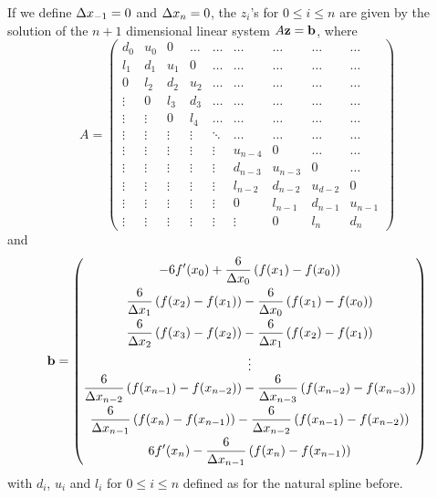 If we define $\Delta{x_{-1}} = 0$ and $\Delta{x_n} = 0$,
the $z_i$'s for $0\leq i \leq n$ are given by the solution of the
$n+1$ dimensional linear system $A \mathbf{z} = \mathbf{b}$,
where
\begin{equation} \label{ccs1}
A = \left( \begin{array}{ccccccccc}
d_0  & u_0 & 0 & \ldots & \ldots & \ldots & \ldots & \ldots & \ldots \\ 
l_1 & d_1  & u_1 & 0 & \ldots & \ldots & \ldots & \ldots & \ldots \\ 
0 & l_2 & d_2 & u_2 & \ldots & \ldots & \ldots & \ldots & \ldots \\ 
\vdots & 0 & l_3 & d_3 & \ldots & \ldots & \ldots & \ldots & \ldots \\ 
\vdots & \vdots & 0 & l_4 & \ldots & \ldots & \ldots & \ldots & \ldots \\ 
\vdots & \vdots & \vdots & \vdots & \ddots & \ldots & \ldots &
\ldots & \ldots \\ 
\vdots & \vdots & \vdots & \vdots & \vdots & u_{n-4} & 0 & \ldots & \ldots \\ 
\vdots & \vdots & \vdots & \vdots & \vdots & d_{n-3} &  u_{n-3} & 0 & \ldots \\ 
\vdots & \vdots & \vdots & \vdots & \vdots & l_{n-2} &  d_{n-2} & u_{d-2} & 0 \\ 
\vdots & \vdots & \vdots & \vdots & \vdots & 0 & l_{n-1} & d_{n-1} & u_{n-1} \\
\vdots & \vdots & \vdots & \vdots & \vdots & \vdots & 0 & l_n & d_n 
\end{array} \right)
\end{equation}
and
\[
\mathbf{b} = \begin{pmatrix}
\displaystyle - 6f'(x_0) + \frac{6}{\Delta{x_0}}\left(f(x_1)-f(x_0)\right)
\\[0.8em]
\displaystyle \frac{6}{\Delta{x_1}}\left(f(x_2) -f(x_1) \right)
- \frac{6}{\Delta{x_0}} \left(f(x_1) - f(x_0) \right) \\[0.8em]
\displaystyle \frac{6}{\Delta{x_2}}\left(f(x_3) -f(x_2) \right)
- \frac{6}{\Delta{x_1}} \left(f(x_2) - f(x_1) \right) \\[0.8em]
\vdots \\
\displaystyle \frac{6}{\Delta{x_{n-2}}}\left(f(x_{n-1}) -f(x_{n-2}) \right)
- \frac{6}{\Delta{x_{n-3}}} \left(f(x_{n-2}) - f(x_{n-3}) \right) \\[0.8em]
\displaystyle \frac{6}{\Delta{x_{n-1}}}\left(f(x_n) -f(x_{n-1}) \right)
- \frac{6}{\Delta{x_{n-2}}} \left(f(x_{n-1}) - f(x_{n-2}) \right) \\[0.8em]
\displaystyle 6f'(x_n) - \frac{6}{\Delta{x_{n-1}}}\left(f(x_n)-f(x_{n-1})\right)
\end{pmatrix}
\]
with $d_i$, $u_i$ and $l_i$ for $0 \leq i \leq n$ defined as for
the natural spline before.

